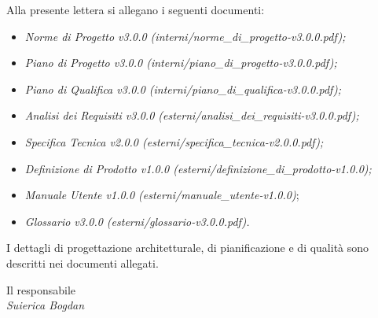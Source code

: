 \noindent Alla presente lettera si allegano i seguenti documenti:
\begin{itemize}
	\item \textit{Norme di Progetto v3.0.0 (interni/norme\_di\_progetto-v3.0.0.pdf);}
	\item \textit{Piano di Progetto v3.0.0 (interni/piano\_di\_progetto-v3.0.0.pdf);}
	\item \textit{Piano di Qualifica v3.0.0 (interni/piano\_di\_qualifica-v3.0.0.pdf);}
	\item \textit{Analisi dei Requisiti v3.0.0 (esterni/analisi\_dei\_requisiti-v3.0.0.pdf);}
	\item \textit{Specifica Tecnica v2.0.0 (esterni/specifica\_tecnica-v2.0.0.pdf);}
	\item \textit{Definizione di Prodotto v1.0.0 (esterni/definizione\_di\_prodotto-v1.0.0);}
	\item \textit{Manuale Utente v1.0.0 (esterni/manuale\_utente-v1.0.0)};
	\item \textit{Glossario v3.0.0 (esterni/glossario-v3.0.0.pdf).}\\
\end{itemize}

I dettagli di progettazione architetturale, di pianificazione e di qualità sono descritti nei documenti allegati.\\

\begin{flushright}
	Il responsabile\\
	\textit{Suierica Bogdan}
\end{flushright}